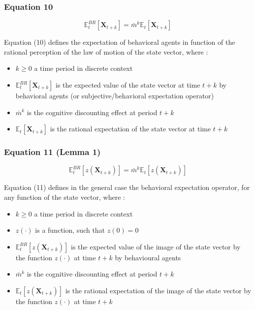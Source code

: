 \documentclass{article}
\begin{document}
\subsubsection*{Equation 10}

\begin{equation}
    \mathbb{E}_{t}^{BR}\left[\bm{X}_{t+k}\right]=\bar{m}^{k}\mathbb{E}_{t}\left[\bm{X}_{t+k}\right]
\end{equation}

Equation (10) defines the expectation of behavioral agents in function of the rational perception of the law of motion of the state vector, where : 
\begin{itemize}
    \item $k\geq 0$ a time period in discrete context
    \item $\mathbb{E}_{t}^{BR}\left[\bm{X}_{t+k}\right]$ is the expected value of the state vector at time $t+k$ by behavioral agents (or subjective/behavioral expectation operator)
    \item $\bar{m}^{k}$ is the cognitive discounting effect at period $t+k$
    \item $\mathbb{E}_{t}\left[\bm{X}_{t+k}\right]$ is the rational expectation of the state vector at time $t+k$
\end{itemize}

\subsubsection*{Equation 11 (Lemma 1)}

\begin{equation}
    \mathbb{E}_{t}^{BR}\left[z\left(\bm{X}_{t+k}\right)\right]=\bar{m}^{k}\mathbb{E}_{t}\left[z\left(\bm{X}_{t+k}\right)\right]
\end{equation}

Equation (11) defines in the general case the behavioral expectation operator, for any function of the state vector, where : 
\begin{itemize}
    \item $k\geq 0$ a time period in discrete context
    \item $z(\cdot)$ is a function, such that $z(0)=0$
    \item $\mathbb{E}_{t}^{BR}\left[z\left(\bm{X}_{t+k}\right)\right]$ is the expected value of the image of the state vector by the function $z(\cdot)$ at time $t+k$ by behavioural agents
    \item $\bar{m}^{k}$ is the cognitive discounting effect at period $t+k$
    \item $\mathbb{E}_{t}\left[z\left(\bm{X}_{t+k}\right)\right]$ is the rational expectation of the image of the state vector by the function $z(\cdot)$ at time $t+k$
\end{itemize}
\end{document}
